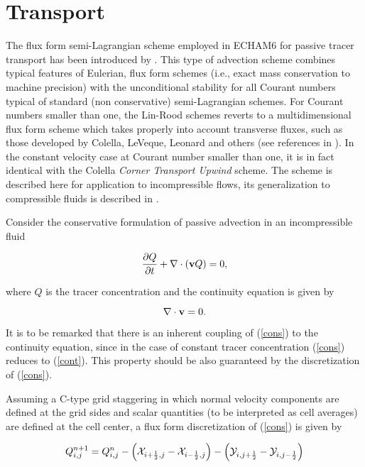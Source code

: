 \section{Transport}

The flux form semi-Lagrangian scheme employed in ECHAM6 for passive
tracer transport has been introduced by \cite{lin96}.  This
type of advection scheme combines typical features of Eulerian, flux
form schemes (i.e., exact mass conservation to machine precision) with
the unconditional stability for all Courant numbers typical of
standard (non conservative) semi-Lagrangian schemes. For Courant
numbers smaller than one, the Lin-Rood schemes reverts to a
multidimensional flux form scheme which takes properly into account
transverse fluxes, such as those developed by Colella, LeVeque,
Leonard and others (see references in \cite{lin96}).  In the constant
velocity case at Courant number smaller than one, it is in fact
identical with the Colella {\it Corner Transport Upwind} scheme.  The
scheme is described here for application to incompressible flows, its
generalization to compressible fluids is described in \cite{lin96}.

Consider the conservative formulation of passive  advection 
in an incompressible fluid

\begin{equation}
\frac {\partial Q}{\partial t} + \nabla \cdot ( {\bf v}Q) =0, 
\label{cons}
\end{equation}

where $Q$ is the tracer concentration and the continuity equation is
given by

\begin{equation}
\nabla \cdot  {\bf v} =0.
\label{cont}
\end{equation}

It is to be remarked that there is an inherent coupling of
(\ref{cons}) to the continuity equation, since in the case of constant
tracer concentration (\ref{cons}) reduces to (\ref{cont}). This
property should be also guaranteed by the discretization of
(\ref{cons}).


Assuming a C-type grid staggering in which normal velocity components
are defined at the grid sides and scalar quantities (to be interpreted
as cell averages) are defined at the cell center, a flux form
discretization of (\ref{cons}) is given by


\begin{equation}
Q_{i,j}^{n+1} = Q_{i,j}^{n} 
- \Big ( {\cal X}_{i+\frac 12,j} -{\cal X}_{i-\frac 12,j} \Big ) 
-\Big (  {\cal Y}_{i,j+\frac 12} -{\cal Y}_{i,j-\frac 12} \Big )
\label{disc1}
\end{equation}

